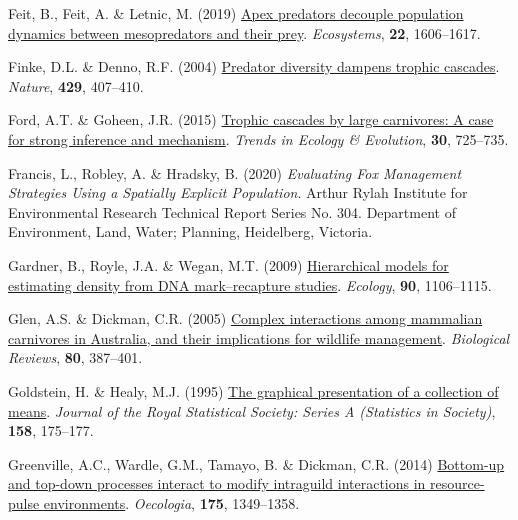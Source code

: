 \documentclass[preprint, 3p, authoryear]{elsarticle} %
\newlength{\cslhangindent}
\newlength{\cslentryspacingunit} %
\newenvironment{CSLReferences}[2] %
 {%
  \setlength{\parindent}{0pt}
  \ifodd #1
  \let\oldpar\par
  \def\par{\hangindent=\cslhangindent\oldpar}
  \fi
  \setlength{\parskip}{#2\cslentryspacingunit}
 }%
 {}
\begin{document}
\begin{CSLReferences}{1}{0}
\leavevmode{}%
Feit, B., Feit, A. \& Letnic, M. (2019) \href{https://doi.org/10.1007/s10021-019-00360-2}{Apex predators decouple population dynamics between mesopredators and their prey}. \emph{Ecosystems}, \textbf{22}, 1606--1617.

\leavevmode{}%
Finke, D.L. \& Denno, R.F. (2004) \href{https://doi.org/10.1038/nature02554}{Predator diversity dampens trophic cascades}. \emph{Nature}, \textbf{429}, 407--410.

\leavevmode{}%
Ford, A.T. \& Goheen, J.R. (2015) \href{https://doi.org/10.1016/j.tree.2015.09.012}{Trophic cascades by large carnivores: A case for strong inference and mechanism}. \emph{Trends in Ecology \& Evolution}, \textbf{30}, 725--735.

\leavevmode{}%
Francis, L., Robley, A. \& Hradsky, B. (2020) \emph{Evaluating Fox Management Strategies Using a Spatially Explicit Population}. Arthur Rylah Institute for Environmental Research Technical Report Series No. 304. Department of Environment, Land, Water; Planning, Heidelberg, Victoria.

\leavevmode{}%
Gardner, B., Royle, J.A. \& Wegan, M.T. (2009) \href{https://doi.org/10.1890/07-2112.1}{Hierarchical models for estimating density from DNA mark--recapture studies}. \emph{Ecology}, \textbf{90}, 1106--1115.

\leavevmode{}%
Glen, A.S. \& Dickman, C.R. (2005) \href{https://doi.org/10.1017/S1464793105006718}{Complex interactions among mammalian carnivores in {{A}ustralia}, and their implications for wildlife management}. \emph{Biological Reviews}, \textbf{80}, 387--401.

\leavevmode{}%
Goldstein, H. \& Healy, M.J. (1995) \href{https://doi.org/10.2307/2983411}{The graphical presentation of a collection of means}. \emph{Journal of the Royal Statistical Society: Series A (Statistics in Society)}, \textbf{158}, 175--177.

\leavevmode{}%
Greenville, A.C., Wardle, G.M., Tamayo, B. \& Dickman, C.R. (2014) \href{https://doi.org/10.1007/s00442-014-2977-8}{Bottom-up and top-down processes interact to modify intraguild interactions in resource-pulse environments}. \emph{Oecologia}, \textbf{175}, 1349--1358.


\end{CSLReferences}
\end{document}
